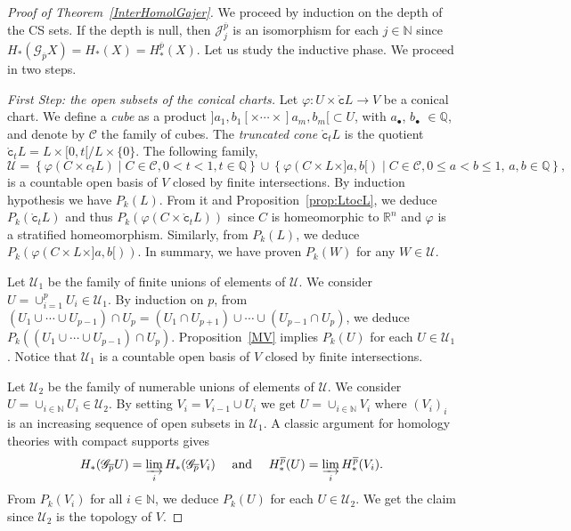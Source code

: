 \documentclass[a4paper,10pt,english,reqno]{amsart}
\theoremstyle{plain}
\theoremstyle{definition}
\theoremstyle{remark}
\numberwithin{equation}{section}
\newcommand{\thmref}[1]{Theorem~\ref{#1}}
\newcommand{\propref}[1]{Proposition~\ref{#1}}
\def\R{{\mathbb R}}
\def\ov{\overline}
\def\cC{{\mathcal C}}
\def\cJ{{\mathcal J}}
\def\cU{{\mathcal U}}
\def\crG{{\mathscr G}}
\def\tc{{\mathtt c}}
\def\N{\mathbb{N}}
\def\Q{\mathbb{Q}}
\def\R{\mathbb{R}}
\def\rc{{\mathring{\tc}}}
\renewcommand\1{\hbox{\ding{192}}}
\renewcommand\2{\hbox{\ding{193}}}
\newcommand\3{\hbox{\ding{194}}}
\newcommand\4{\hbox{\ding{195}}}
\begin{document}
   
\begin{proof}[Proof of \thmref{InterHomolGajer}]
We proceed by induction on the depth of the CS sets. If the depth is null, then $\cJ_{j}^{\ov{p}}$ is an isomorphism for each $j\in \N$
 since $H_*(\crG_{\ov p} X) = H_*(X) = H_*^{\ov p} (X)$.
  Let us study the inductive phase. We proceed in two steps.

\emph{First Step: the open subsets of the conical charts.}  
Let $\varphi \colon U \times \rc L \to V$ be a conical chart. 
We define a \emph{cube}  as a product 
$]a_{1},b_{1}[ \times \cdots \times 
]a_{m},b_{m}[ \subset U$, with $a_{\bullet}$, $b_{\bullet}$ $\in\Q$,
 and denote by $\cC$ the family of cubes.
The {\em truncated cone} $\rc_{t}L$ is  the quotient $\rc_{t}L = L\times [0,t[ / L \times \{ 0\}$. 
The following family,
$$
\mathcal{U} = 
\left\{ \varphi(C\times c_{t}L )\mid C \in \cC,
0<t<1, t\in\Q  \right\} \cup 
\left\{ \varphi(C \times L \times ]a,b[ ) \mid
C \in \cC, 
0\leq a < b \leq 1,\,a, b\in\Q
 \right\},
$$
%
is a countable open basis of $V$ closed by finite intersections. 
By induction hypothesis we have $P_k(L)$. %
From it and \propref{prop:LtocL}, we deduce $P_{k}(\rc_{t}L)$ and thus
$P_{k}(\varphi(C\times \rc_{t}L))$ since $C$ is homeomorphic to $\R^n$ and $\varphi$ is a stratified homeomorphism.
Similarly, from $P_{k}(L)$, we deduce $P_{k}(\varphi(C\times L\times ]a,b[))$.
In summary, we have proven $P_{k}(W)$ for any $W\in \cU$.

%
Let $\cU_{1}$ be the family of finite unions of elements of $\cU$. We consider $U=\cup_{i=1}^pU_{i}\in\cU_{1}$. 
By induction on $p$, from  $(U_1 \cup \cdots \cup U_{p-1})  \cap U_{p} = (U_1 \cap U_{p+1}  ) \cup \cdots \cup (U_{p-1} \cap U_{p} )
$, we deduce $P_{k}((U_1 \cup \cdots \cup U_{p-1})  \cap U_{p})$.
\propref{MV} implies  $P_k(U)$ for each $U \in \cU_1$.
Notice that $\cU_{1}$ is a countable open basis of $V$ closed by finite intersections.

%
Let $\cU_{2}$ be the family of numerable unions of elements of $\cU$. We consider $U=\cup_{i\in\N}U_{i}\in \cU_{2}$.
By setting $V_{i}=V_{i-1}\cup U_{i}$ we get $U=\cup_{i\in \N}V_{i}$ where $(V_{i})_{i}$ is an increasing sequence of open subsets in $\cU_{1}$.
A classic argument for homology theories with compact supports gives
$$
H_*(\crG_{\ov p} U) = \varinjlim_iH_*(\crG_{\ov p} V_i)
\ \ \ 
\hbox{ and }
\ \ \ 
H_*^{\ov p}(U)= \varinjlim_i H_*^{\ov p}(V_i).
$$
From $P_{k}(V_{i})$ for all $i\in \N$, we deduce $P_{k}(U)$ for each $U\in\cU_{2}$.
% 
We get the claim since $\cU_{2}$ is  the topology of $V$.



\end{proof}
\end{document}
